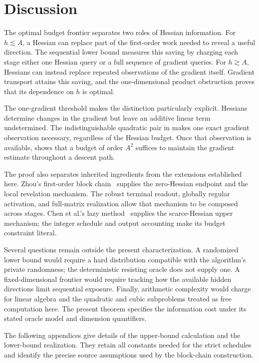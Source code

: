 \documentclass[11pt]{article}
\theoremstyle{remark}
\theoremstyle{remark}
\begin{document}
\section{Discussion}\label{sec:discussion}
The optimal budget frontier separates two roles of Hessian information.
For $h\lesssim A$, a Hessian can replace part of the first-order work
needed to reveal a useful direction. The sequential lower bound measures
this saving by charging each stage either one Hessian query or a full
sequence of gradient queries. For $h\gtrsim A$, Hessians can instead
replace repeated observations of the gradient itself. Gradient transport
attains this saving, and the one-dimensional product obstruction proves
that its dependence on $h$ is optimal.

The one-gradient threshold makes the distinction particularly explicit.
Hessians determine changes in the gradient but leave an additive linear
term undetermined. The indistinguishable quadratic pair in
 makes one exact gradient observation necessary, regardless
of the Hessian budget. Once that observation is available,
 shows that a budget of order $A^2$ suffices to
maintain the gradient estimate throughout a descent path.

The proof also separates inherited ingredients from the extensions
established here. Zhou's first-order block chain~\cite{zhou} supplies the
zero-Hessian endpoint and the local revelation mechanism. The robust
terminal readout, globally regular activation, and full-matrix realization
allow that mechanism to be composed across stages. Chen et al.'s lazy
method~\cite{chen} supplies the scarce-Hessian upper mechanism; the
integer schedule and output accounting make its budget constraint
literal.

Several questions remain outside the present characterization. A
randomized lower bound would require a hard distribution compatible
with the algorithm's private randomness; the deterministic resisting
oracle does not supply one. A fixed-dimensional frontier would require
tracking how the available hidden directions limit sequential exposure.
Finally, arithmetic complexity would charge for linear algebra and
the quadratic and cubic subproblems treated as free computation here.
The present theorem specifies the information cost under its stated
oracle model and dimension quantifiers.

\appendix
The following appendices give details of the upper-bound calculation and the lower-bound realization. They retain all constants needed for the strict schedules and identify the precise source assumptions used by the block-chain construction.
\end{document}
